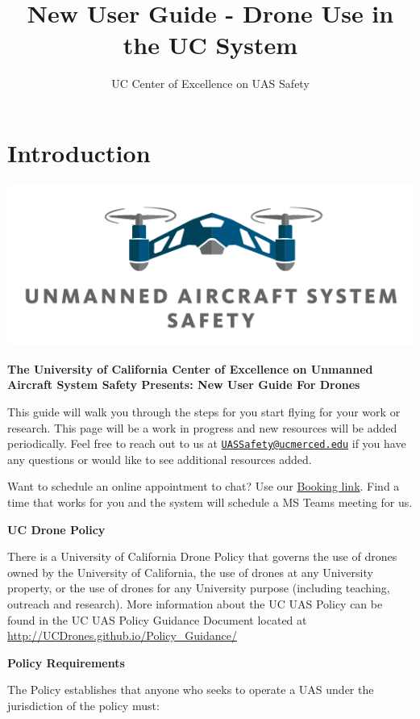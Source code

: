 \documentclass[
  12pt,
]{book}
\title{New User Guide - Drone Use in the UC System}
\author{UC Center of Excellence on UAS Safety}
\date{}
\begin{document}
\maketitle

{
\setcounter{tocdepth}{1}
\tableofcontents
}
\hypertarget{introduction}{%
\chapter*{Introduction}\label{introduction}}

\begin{center}\includegraphics[width=0.5\linewidth]{images/COE_logo} \end{center}

\textbf{The University of California Center of Excellence on Unmanned Aircraft System Safety Presents: New User Guide For Drones}

This guide will walk you through the steps for you start flying for your work or research. This page will be a work in progress and new resources will be added periodically. Feel free to reach out to us at \href{mailto:UASSafety@ucmerced.edu}{\nolinkurl{UASSafety@ucmerced.edu}} if you have any questions or would like to see additional resources added.

Want to schedule an online appointment to chat? Use our \href{https://outlook.office365.com/owa/calendar/UCCenterofExcellenceonUASSafety@merced.onmicrosoft.com/bookings/}{Booking link}. Find a time that works for you and the system will schedule a MS Teams meeting for us.

\textbf{UC Drone Policy}

There is a University of California Drone Policy that governs the use of drones owned by the University of California, the use of drones at any University property, or the use of drones for any University purpose (including teaching, outreach and research). More information about the UC UAS Policy can be found in the UC UAS Policy Guidance Document located at \url{http://UCDrones.github.io/Policy_Guidance/}

\textbf{Policy Requirements}

The Policy establishes that anyone who seeks to operate a UAS under the jurisdiction of the policy must:
\end{document}
